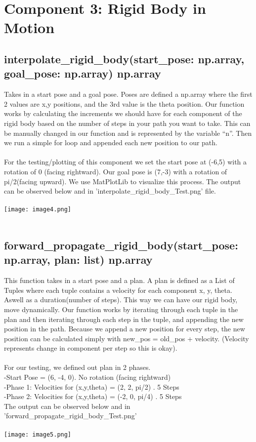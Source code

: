 \documentclass[12pt]{article}
\begin{document}
\section*{Component 3: Rigid Body in Motion}
\subsection*{interpolate\_rigid\_body(start\_pose: np.array, goal\_pose: np.array) \rightarrow{} np.array}
Takes in a start pose and a goal pose. Poses are defined a np.array where the first 2 values are x,y positions, and the 3rd value is the theta position. Our function works by calculating the increments we should have for each component of the rigid body based on the number of steps in your path you want to take. This can be manually changed in our function and is represented by the variable “n”. Then we run a simple for loop and appended each new position to our path.
\\ \\
For the testing/plotting of this component we set the start pose at (-6,5) with a rotation of 0 (facing rightward). Our goal pose is (7,-3) with a rotation of pi/2(facing upward). We use MatPlotLib to visualize this process. The output can be observed below and in 'interpolate\_rigid\_body\_Test.png' file. 
\\ \\
\texttt{[image: image4.png]}
\\ \\


\subsection*{forward\_propagate\_rigid\_body(start\_pose: np.array, plan: list) \rightarrow{} np.array}
This function takes in a start pose and a plan. A plan is defined as a List of Tuples where each tuple contains a velocity for each component x, y, theta. Aswell as a duration(number of steps). This way we can have our rigid body, move dynamically. Our function works by iterating through each tuple in the plan and then iterating through each step in the tuple, and appending the new position in the path. Because we append a new position for every step, the new position can be calculated simply with new\_pos = old\_pos + velocity. (Velocity represents change in component per step so this is okay).
\\ \\
For our testing, we defined out plan in 2 phases.
\\
-Start Pose = (6, -4, 0). No rotation (facing rightward) \\
-Phase 1: Velocities for (x,y,theta) = (2, 2, pi/2) . 5 Steps \\
-Phase 2: Velocities for (x,y,theta) = (-2, 0, pi/4) . 5 Steps \\
The output can be observed below and in 'forward\_propagate\_rigid\_body\_Test.png' \\
\\
\texttt{[image: image5.png]}
\end{document}
